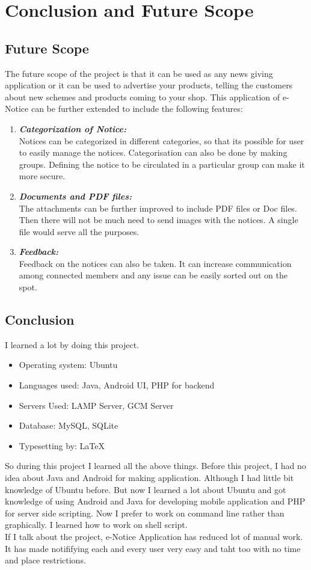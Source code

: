 \chapter{Conclusion and Future Scope}
\section{Future Scope}
The future scope of the project is that it can be used as any news giving application or it can be used to advertise your products,
telling the customers about new schemes and products coming to your shop.
This application of e-Notice can be further extended to include the following features:
\begin{enumerate}
\item \textbf{\emph{Categorization of Notice:}}\\
Notices can be categorized in different categories, so that its possible for user to easily manage the notices.
Categorisation can also be done by making groups. Defining the notice to be circulated in a particular group can make it more secure.

\item \textbf{\emph{Documents and PDF files:}}\\
The attachments can be further improved to include PDF files or Doc files. Then there will not be much need to send images with the notices.
A single file would serve all the purposes.

\item \textbf{\emph{Feedback:}}\\
Feedback on the notices can also be taken. It can increase communication among connected members and any issue can be easily sorted out on the spot.
\end{enumerate}
\pagebreak
\section{Conclusion}

I learned a lot by doing this project.
\begin{itemize}
\item Operating system:
Ubuntu
\item Languages used:
Java, Android UI, PHP for backend
\item Servers Used:
LAMP Server, GCM Server
\item Database:
MySQL, SQLite
\item Typesetting by:
\LaTeX
\end{itemize}
So during this project I learned all the above things. Before this project, I had no idea about
Java and Android for making application. Although I had little bit knowledge of
Ubuntu before. But now I learned a lot about Ubuntu and got knowledge of using Android and Java for developing mobile
application and PHP for server side scripting. Now I prefer to work on command line rather than graphically. I learned how to work
on shell script.\\
If I talk about the project, e-Notice Application has reduced lot of manual work. It has made notififying each and every user very easy and taht too with no time and place restrictions.
